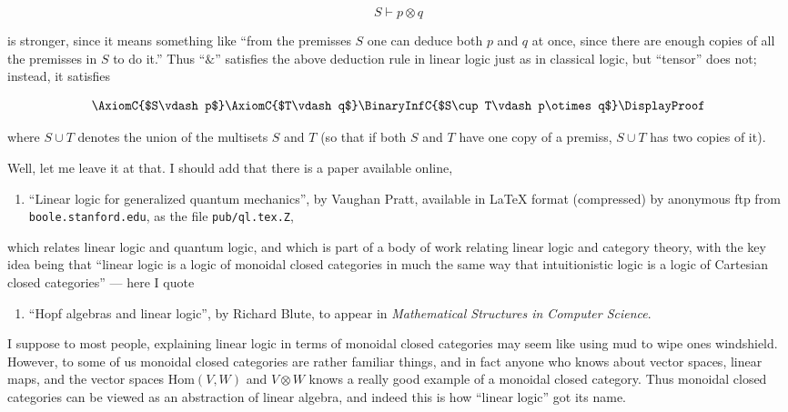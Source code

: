 \documentclass{article}
\def\tightlist{}
\begin{document}
\[S\vdash p\otimes q\]

is stronger, since it means something like ``from the premisses \(S\)
one can deduce both \(p\) and \(q\) at once, since there are enough
copies of all the premisses in \(S\) to do it.'' Thus ``\(\&\)''
satisfies the above deduction rule in linear logic just as in classical
logic, but ``tensor'' does not; instead, it satisfies

\[\AxiomC{$S\vdash p$}\AxiomC{$T\vdash q$}\BinaryInfC{$S\cup T\vdash p\otimes q$}\DisplayProof\]

where \(S \cup T\) denotes the union of the multisets \(S\) and \(T\)
(so that if both \(S\) and \(T\) have one copy of a premiss,
\(S \cup T\) has two copies of it).

Well, let me leave it at that. I should add that there is a paper
available online,

\begin{enumerate}
\def\labelenumi{\arabic{enumi})}
\setcounter{enumi}{1}
\tightlist
\item
  ``Linear logic for generalized quantum mechanics'', by Vaughan Pratt,
  available in LaTeX format (compressed) by anonymous ftp from
  \texttt{boole.stanford.edu}, as the file \texttt{pub/ql.tex.Z},
\end{enumerate}

which relates linear logic and quantum logic, and which is part of a
body of work relating linear logic and category theory, with the key
idea being that ``linear logic is a logic of monoidal closed categories
in much the same way that intuitionistic logic is a logic of Cartesian
closed categories'' --- here I quote

\begin{enumerate}
\def\labelenumi{\arabic{enumi})}
\setcounter{enumi}{2}
\tightlist
\item
  ``Hopf algebras and linear logic'', by Richard Blute, to appear in
  \emph{Mathematical Structures in Computer Science}.
\end{enumerate}

I suppose to most people, explaining linear logic in terms of monoidal
closed categories may seem like using mud to wipe ones windshield.
However, to some of us monoidal closed categories are rather familiar
things, and in fact anyone who knows about vector spaces, linear maps,
and the vector spaces \(\mathrm{Hom}(V,W)\) and \(V\otimes W\) knows a
really good example of a monoidal closed category. Thus monoidal closed
categories can be viewed as an abstraction of linear algebra, and indeed
this is how ``linear logic'' got its name.
\end{document}
